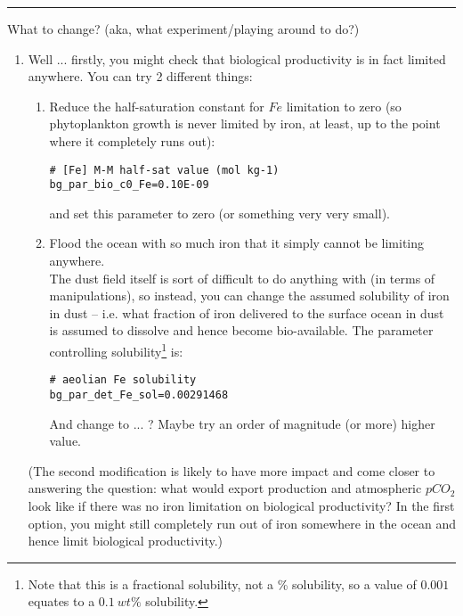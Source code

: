 \vspace{1mm}
\noindent\rule{4cm}{0.1mm}
\vspace{2mm}

\noindent What to change? (aka, what experiment/playing around to do?)

\begin{enumerate}[noitemsep]

\vspace{1mm}
\item Well ... firstly, you might check that biological productivity is in fact limited anywhere. You can try 2 different things:
\begin{enumerate}[noitemsep]
\vspace{1mm}
\item Reduce the half-saturation constant for \(Fe\) limitation to zero (so phytoplankton growth is never limited by iron, at least, up to the point where it completely runs out):
\vspace{-1mm}\small\begin{verbatim}
# [Fe] M-M half-sat value (mol kg-1)
bg_par_bio_c0_Fe=0.10E-09
\end{verbatim}\normalsize\vspace{-1mm}
and set this parameter to zero (or something very very small).
\vspace{1mm}
\item Flood the ocean with so much iron that it simply cannot be limiting anywhere.
\vspace{1mm}
\\The dust field itself is sort of difficult to do anything with (in terms of manipulations), so instead, you can change the assumed solubility of iron in dust -- i.e. what fraction of iron delivered to the surface ocean in dust is assumed to dissolve and hence become bio-available. The parameter controlling solubility\footnote{Note that this is a fractional solubility, not a \% solubility, so a value of \(0.001\) equates to a \(0.1\:wt\%\) solubility.} is:
\vspace{-1mm}\small\begin{verbatim}
# aeolian Fe solubility
bg_par_det_Fe_sol=0.00291468
\end{verbatim}\normalsize\vspace{-1mm}
And change to ... ? Maybe try an order of magnitude (or more) higher value.
\end{enumerate}
\vspace{1mm}
(The second modification is likely to have more impact and come closer to answering the question: what would export production and atmospheric \(pCO_{2}\) look like if there was no iron limitation on biological productivity? In the first option, you might still completely run out of iron somewhere in the ocean and hence limit biological productivity.)


\end{enumerate}
